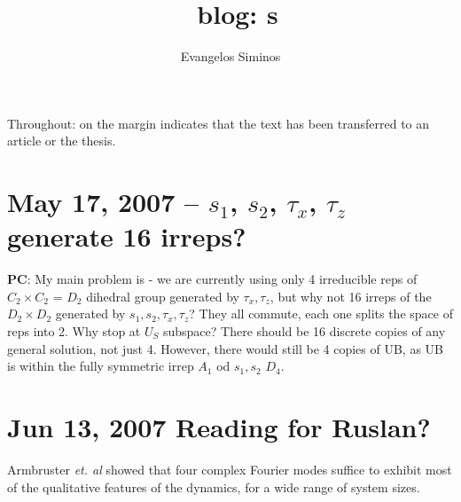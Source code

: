 \documentclass[letter,10pt]{article}
\title{\KS\ blog: \rpo s}
\author{Evangelos Siminos}
\begin{document}
\maketitle

\setcounter{page}{1}
\tableofcontents
\newpage

Throughout:  {\textdollar} on the margin
{\steady}
indicates that the text has been transferred to an
article or the thesis.






\newpage

\section{May 17, 2007 -- $s_1$, $s_2$, $\tau_x$, $\tau_z$ generate 16 irreps?}

{\bf PC}: My main problem is - we are currently using only 4 irreducible reps
of $C_2 \times C_2$ = $D_2$ dihedral group generated by $\tau_x, \tau_z$,
but why not 16 irreps of
the $D_2 \times D_2$ generated by $s_1, s_2, \tau_x, \tau_z$?
They all commute, each one splits the space of reps into 2.
Why stop at $U_S$ subspace?
There should be 16 discrete copies of any
general solution, not just 4.
However, there would still be 4 copies of UB, as UB is within the
fully symmetric irrep $A_1$ od $s_1, s_2$ $D_4$.

\section{Jun 13, 2007 Reading for Ruslan?}

Armbruster {\em et. al} showed that four complex Fourier
modes suffice to exhibit most
of the qualitative features of the dynamics,
for a wide range of system sizes.






\end{document}
